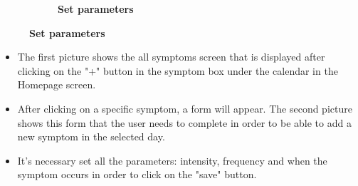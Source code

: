 \documentclass [12pt]{article}
\begin{document}
\begin{description}[leftmargin=1cm,rightmargin=1cm]
\begin{figure}[h!]
\begin{subfigure}[tr]{0.3\linewidth}
\caption{\textbf{Set parameters}}
\end{subfigure}
\hspace*{\fill}
\end{figure}
\begin{itemize}[•]
\item The first picture shows the all symptoms screen that is displayed after clicking on the "+" button in the symptom box under the calendar in the Homepage screen. 
\item After clicking on a specific symptom, a form will appear. The second picture shows this form that the user needs to complete in order to be able to add a new symptom in the selected day. 
\item It's necessary set all the parameters: intensity, frequency and when the symptom occurs in order to click on the "save" button.
\end{itemize}
\clearpage
\item [ 2)Add Dish page]
\
\
\
\begin{figure}[h!]
\centering
\hspace*{\fill}
\begin{subfigure}[tl]{0.3\linewidth}

\end{subfigure}
\end{figure}
\end{description}
\end{document}
